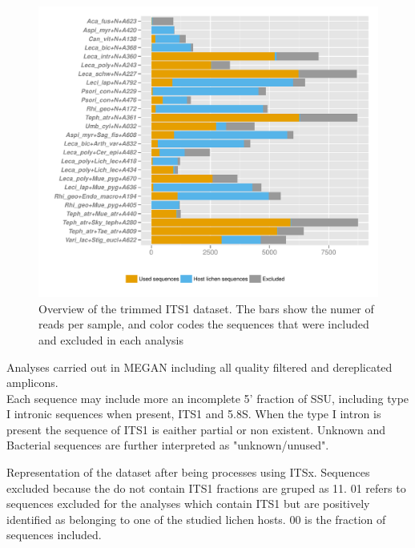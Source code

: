 \documentclass[a4paper, 11]{article}\usepackage[]{graphicx}\usepackage[]{color}
\makeatletter
\def\maxwidth{ %
  \ifdim\Gin@nat@width>\linewidth
    \linewidth
  \else
    \Gin@nat@width
  \fi
}
\newenvironment{knitrout}{}{} %
\makeatother
\begin{document}
\begin{knitrout}
\color{fgcolor}\begin{figure}[H]
\includegraphics[width=\maxwidth]{figure/3A_Fig1-1} \caption[Overview of the trimmed ITS1 dataset]{Overview of the trimmed ITS1 dataset. The bars show the numer of reads per sample, and color codes the sequences that were included and excluded in each analysis}\label{fig:3A_Fig1}
\end{figure}


\end{knitrout}
%
%
%
%
%
%
%
%
%
%
Analyses carried out in MEGAN including all quality filtered and dereplicated amplicons.\\
Each sequence may include more an incomplete 5' fraction of SSU, including type I intronic sequences when present, ITS1 and 5.8S. When the type I intron is present the sequence of ITS1 is eaither partial or non existent.
Unknown and Bacterial sequences are further interpreted as "unknown/unused".

Representation of the dataset after being processes using ITSx. Sequences excluded because the do not contain ITS1 fractions are
gruped as 11. 01 refers to sequences excluded for the analyses which contain ITS1 but are positively identified as belonging to one of the studied lichen hosts. 00 is the fraction of sequences included.\\
\end{document}

